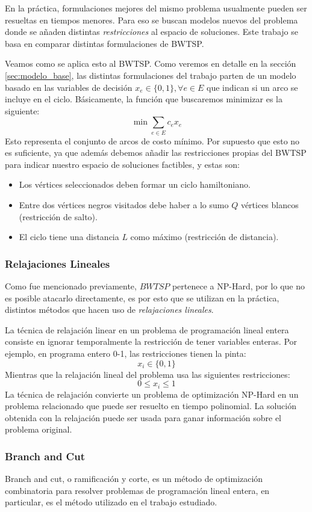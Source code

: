 \documentclass[10pt, a4paper]{article}
\theoremstyle{definition}
\begin{document}
En la práctica, formulaciones mejores del mismo problema usualmente pueden ser resueltas en tiempos menores. Para eso se buscan modelos nuevos del problema donde se añaden distintas \textit{restricciones} al espacio de soluciones. Este trabajo se basa en comparar distintas formulaciones de BWTSP.

Veamos como se aplica esto al BWTSP. Como veremos en detalle en la sección \ref{sec:modelo_base}, las distintas formulaciones del trabajo parten de un modelo basado en las variables de decisión $x_e \in \{0,1\}, \forall e \in E$ que indican si un arco se incluye en el ciclo. Básicamente, la función que buscaremos minimizar es la siguiente:
$$\min \sum_{e \in E} c_{e} x_{e}$$
Esto representa el conjunto de arcos de costo mínimo. Por supuesto que esto no es suficiente, ya que además debemos añadir las restricciones propias del BWTSP para indicar nuestro espacio de soluciones factibles, y estas son:
\begin{itemize}
  \item Los vértices seleccionados deben formar un ciclo hamiltoniano.
  \item Entre dos vértices negros visitados debe haber a lo sumo $Q$ vértices blancos (restricción de salto).
  \item El ciclo tiene una distancia $L$ como máximo (restricción de distancia).
\end{itemize} 

\subsubsection{Relajaciones Lineales}
Como fue mencionado previamente, $BWTSP$ pertenece a NP-Hard, por lo que no es posible atacarlo directamente, es por esto que se utilizan en la práctica, distintos métodos que hacen uso de \textit{relajaciones lineales}.

La técnica de relajación linear en un problema de programación lineal entera consiste en ignorar temporalmente la restricción de tener variables enteras. Por ejemplo, en programa entero 0-1, las restricciones tienen la pinta:
$$x_i \in \{0,1\}$$
Mientras que la relajación lineal del problema usa las siguientes restricciones:
$$0 \leq x_i \leq 1$$
La técnica de relajación convierte un problema de optimización NP-Hard en un problema relacionado que puede ser resuelto en tiempo polinomial. La solución obtenida con la relajación puede ser usada para ganar información sobre el problema original. 


\subsubsection{Branch and Cut}
Branch and cut, o ramificación y corte, es un método de optimización combinatoria para resolver problemas de programación lineal entera, en particular, es el método utilizado en el trabajo estudiado.
\end{document}
